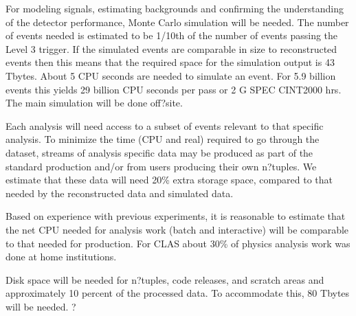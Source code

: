 For modeling signals, estimating backgrounds and confirming the understanding of the detector performance, Monte Carlo simulation will be needed. The number of events needed is estimated to be 1/10th of the number of events passing the Level 3 trigger. If the simulated events are comparable in size to reconstructed events then this means that the required space for the simulation output is 43 Tbytes. About 5 CPU seconds are needed to simulate an event. For 5.9 billion events this yields 29 billion CPU seconds per pass or 2 G SPEC CINT2000 hrs. The main simulation will be done off?site.

Each analysis will need access to a subset of events relevant to that specific analysis. To minimize the time (CPU and real) required to go through the dataset, streams of analysis specific data may be produced as part of the standard production and/or from users producing their own n?tuples. We estimate that these data will need 20\% extra storage space, compared to that needed by the reconstructed data and simulated data.

Based on experience with previous experiments, it is reasonable to estimate that the net CPU needed for analysis work (batch and interactive) will be comparable to that needed for production. For CLAS about 30\% of physics analysis work was done at home institutions.

Disk space will be needed for n?tuples, code releases, and scratch areas and approximately 10 percent of the processed data. To accommodate this, 80 Tbytes will be needed.
?

